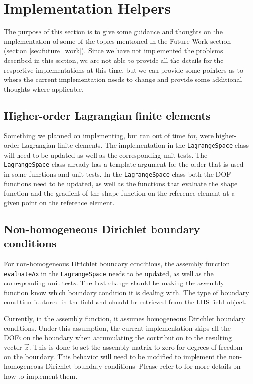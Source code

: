 \chapter{Implementation Helpers}

\label{chp:implementation_help}

The purpose of this section is to give some guidance and thoughts on the implementation
of some of the topics mentioned in the Future Work section (section \ref{sec:future_work}).
Since we have not implemented the problems described in this section, we
are not able to provide all the details for the respective implementations at this time,
but we can provide some pointers as to where the current implementation needs to change
and provide some additional thoughts where applicable.

\section{Higher-order Lagrangian finite elements}

Something we planned on implementing, but ran out of time for, were higher-order Lagrangian finite elements.
The implementation in the \texttt{LagrangeSpace} class will need to be updated as well as the corresponding unit tests.
The \texttt{LagrangeSpace} class already has a template argument for the order that is used in some functions and unit tests.
In the \texttt{LagrangeSpace} class both the DOF functions need to be updated,
as well as the functions that evaluate the shape function and the gradient of the shape function on the
reference element at a given point on the reference element.



\section{Non-homogeneous Dirichlet boundary conditions}

For non-homogeneous Dirichlet boundary conditions, the assembly function
\texttt{evaluateAx} in the \texttt{LagrangeSpace} needs to be updated, as well as the corresponding unit tests.
The first change should be making the assembly function know which boundary condition it is dealing with.
The type of boundary condition is stored in the field and should be retrieved from the LHS field object.

Currently, in the assembly function, it assumes homogeneous Dirichlet boundary conditions.
Under this assumption, the current implementation skips all the DOFs on the boundary
when accumulating the contribution to the resulting vector $\vec{z}$.
This is done to set the assembly matrix to zero for degrees of freedom on the boundary.
This behavior will need to be modified to implement the non-homogeneous Dirichlet boundary conditions.
Please refer to \cite[Chapter~2.7.6]{hiptmair_numerical_2023} for more details on how to implement them.

